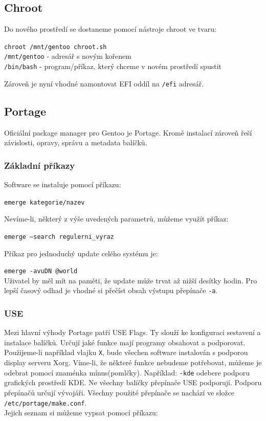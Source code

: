 \documentclass[12pt,a4paper,twoside,]{article}
\begin{document}
{\subsection{\textsf{Chroot}}
Do nového prostředí se dostaneme pomocí nástroje chroot ve tvaru:

\texttt{chroot /mnt/gentoo chroot.sh}\\
\texttt{/mnt/gentoo} - adresář s novým kořenem\\
\texttt{/bin/bash} - program/příkaz, který chceme v novém prostředí spustit

Zároveň je nyní vhodné namontovat EFI oddíl na \texttt{/efi} adresář.

\subsection{\textsf{Portage}}
Oficiální package manager pro Gentoo je Portage. Kromě instalací zároveň řeší závislosti, opravy, správu a metadata balíčků.
\subsubsection{\textsf{Základní příkazy}}
Software se instaluje pomocí příkazu:  

 \texttt{emerge kategorie/nazev} 
 
Nevíme-li, některý z výše uvedených parametrů, můžeme využít příkaz:

\texttt{emerge --search regulerni\_vyraz} 

Příkaz pro jednoduchý update celého systému je:

\texttt{emerge -avuDN @world}\\

Uživatel by měl mít na paměti, že update může trvat až nižší desítky hodin. Pro lepší časový odhad je vhodné si přečíst obsah výstupu přepínače \texttt{-a}. %

\subsubsection{\textsf{USE}}
Mezi hlavní výhody Portage patří USE Flags. Ty slouží ke konfiguraci sestavení a instalace balíčků. Určují jaké funkce mají programy obsahovat a podporovat.\\
Použijeme-li například vlajku \texttt{X}, bude všechen software instalován s podporou display serveru Xorg. Víme-li, že některé funkce nebudeme potřebovat, můžeme je odebrat pomocí znaménka mínus(pomlčky). Například: \texttt{-kde} odebere podporu grafických prostředí KDE.
Ne všechny balíčky přepínače USE podporují. Podporu přepínačů určují vývojáři.
Všechny použité přepínače se nachází ve složce \texttt{/etc/portage/make.conf}. \\
Jejich seznam si můžeme vypsat pomocí příkazu:

}
\end{document}
